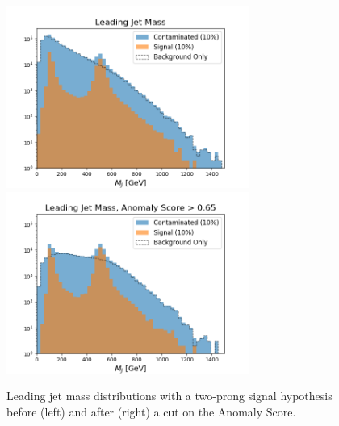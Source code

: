 \documentclass[12pt, a4paper]{article}
\begin{document}
\begin{figure}[H]
	\begin{center}
		\includegraphics[width=225pt]{imgs/2Prong_Contaminated_10p0_J_Mass_Multi_SaveForPaper.png}
		\includegraphics[width=225pt]{imgs/2Prong_Contaminated_10p0_J_Mass_AnomScore0p65_Multi_SaveForPaper.png}
	\end{center}
	\caption{Leading jet mass distributions with a two-prong signal hypothesis before (left) and after (right) a cut on the Anomaly Score.}
	\label{fig:2P_lj_mass}
\end{figure}
\end{document}
